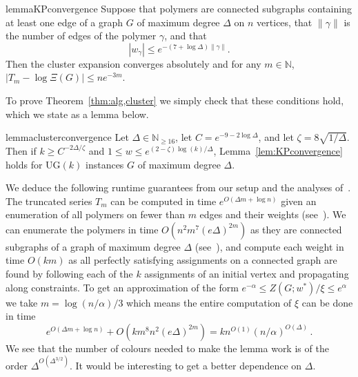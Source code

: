 \documentclass[10pt,a4paper]{article}
\theoremstyle{definition}
\newcommand*{\UG}[1][]{UG$(#1)$}
\begin{document}
%
\begin{restatable}{lemma}{KPconvergence}\label{lem:KPconvergence}
Suppose that polymers are connected subgraphs containing at least one edge of a graph $G$ of maximum degree $\Delta$ on $n$ vertices, that $\|\gamma\|$ is the number of edges of the polymer $\gamma$, and that
\begin{equation}|w_\gamma|\leq e^{-(7+\log\Delta)\|\gamma\|}.\label{eq:ce 2}\end{equation}
Then the cluster expansion converges absolutely and for any $m\in\mathbb N$, $|T_m-\log\Xi(G)|\leq ne^{-3m}$.
\end{restatable}

%
\noindent
To prove Theorem~\ref{thm:alg,cluster} we simply check that these conditions hold, which we state as a lemma below. 
%
\begin{restatable}{lemma}{clusterconvergence}\label{lem:clusterconvergence}
Let $\Delta\in \mathbb{N}_{\geq 16}$, let $C=e^{-9-2\log\Delta}$, and let $\zeta= 8\sqrt{1/\Delta}$.
Then if $k\geq C^{-2\Delta/\zeta}$ and $1\leq w\leq e^{(2-\zeta)\log(k)/\Delta}$, Lemma~\ref{lem:KPconvergence} holds for \UG[k] instances $G$ of maximum degree $\Delta$.
\end{restatable}
%

%
We deduce the following runtime guarantees from our setup and the analyses of~\cite{HPR19,PR17}.
The truncated series $T_m$ can be computed in time $e^{O(\Delta m+\log n)}$ given an enumeration of all polymers on fewer than $m$ edges and their weights (see~\cite{HPR19}). 
We can enumerate the polymers in time $O(n^2m^7(e\Delta)^{2m})$ as they are connected subgraphs of a graph of maximum degree $\Delta$ (see~\cite{PR17}), and compute each weight in time $O(km)$ as all perfectly satisfying assignments on a connected graph are found by following each of the $k$ assignments of an initial vertex and propagating along constraints.
To get an approximation of the form $e^{-\alpha}\le Z(G;w^*)/\xi\le e^\alpha$ we take $m=\log(n/\alpha)/3$ which means the entire computation of $\xi$ can be done in time
\[
e^{O(\Delta m+\log n)} + O(km^8n^2(e\Delta)^{2m})= kn^{O(1)}(n/\alpha)^{O(\Delta)}\,.
\]
We see that the number of colours needed to make the lemma work is of the order $\Delta^{O(\Delta^{3/2})}$. It would be interesting to get a better dependence on $\Delta$.
%
%
\end{document}
